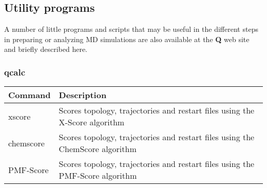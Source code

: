\documentclass[a4paper,10pt]{article}
\begin{document}


\subsection{Utility programs} A number of little programs and scripts that may
be useful in the different steps in preparing or analyzing MD
simulations are also available at the \textbf{Q} web site and briefly
described here.

\subsubsection{\textbf{qcalc}}\label{subsubsec:qcalc}

\begin{tabularx}{\textwidth}{|l|X|}
\hline
  \textbf{Command} & \textbf{Description} \\
  \hline
  xscore           & Scores topology, trajectories and restart files using the X-Score algorithm \\
  chemscore        & Scores topology, trajectories and restart files using the ChemScore algorithm \\
  PMF-Score        & Scores topology, trajectories and restart files using the PMF-Score algorithm \\
\hline
\end{tabularx}
\end{document}
